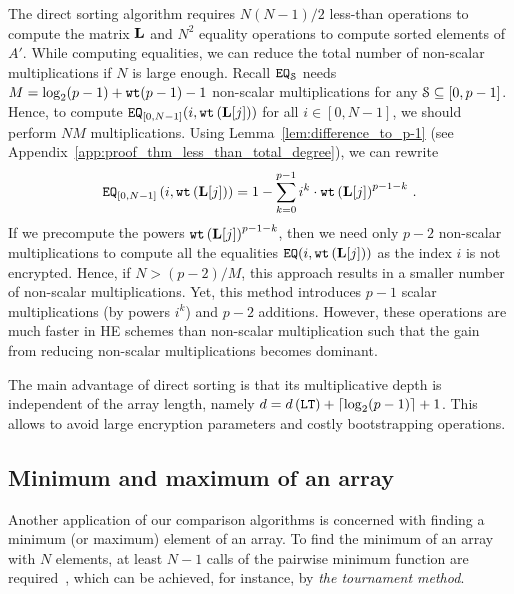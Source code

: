 	The direct sorting algorithm requires $N(N-1)/2$ less-than operations to compute the matrix $\mL$ and $N^2$ equality operations to compute sorted elements of $A'$.
	While computing equalities, we can reduce the total number of non-scalar multiplications if $N$ is large enough.
	Recall $\EQ_\S$ needs $M = \log_2(p-1) + \wt(p-1) - 1$ non-scalar multiplications for any $\S \subseteq [0,p-1]$.
	Hence, to compute $\EQ_{[0,N-1]}(i,\wt\left(\mL[j]\right))$ for all $i \in [0,N-1]$, we should perform $N M$ multiplications.
	Using Lemma~\ref{lem:difference_to_p-1} (see Appendix~\ref{app:proof_thm_less_than_total_degree}), we can rewrite 
	\begin{align*}
		\EQ_{[0,N-1]}\left(i,\wt\left(\mL[j]\right)\right) = 1 - \sum_{k=0}^{p-1} i^k \cdot \wt\left(\mL[j]\right)^{p-1-k}\,.
	\end{align*}
	If we precompute the powers $\wt\left(\mL[j]\right)^{p-1-k}$, then we need only $p-2$ non-scalar multiplications to compute all the equalities $\EQ(i,\wt\left(\mL[j]\right))$ as the index $i$ is not encrypted.
	Hence, if $N > (p-2)/M$, this approach results in a smaller number of non-scalar multiplications.
	Yet, this method introduces $p-1$ scalar multiplications (by powers $i^k$) and $p-2$ additions. 
	However, these operations are much faster in HE schemes than non-scalar multiplication such that the gain from reducing non-scalar multiplications becomes dominant. 
	
	The main advantage of direct sorting is that its multiplicative depth is independent of the array length, namely $d = d\left(\LT\right) + \ceil{\log_2 (p-1)} + 1$.
	This allows to avoid large encryption parameters and costly bootstrapping operations.

\subsection{Minimum and maximum of an array}
\label{sec:min/max}

	Another application of our comparison algorithms is concerned with finding a minimum (or maximum) element of an array.
	To find the minimum of an array with $N$ elements, at least $N-1$ calls of the pairwise minimum function are required~\cite[Chapter 9]{CLR09}, which can be achieved, for instance, by \emph{the tournament method}.
	
